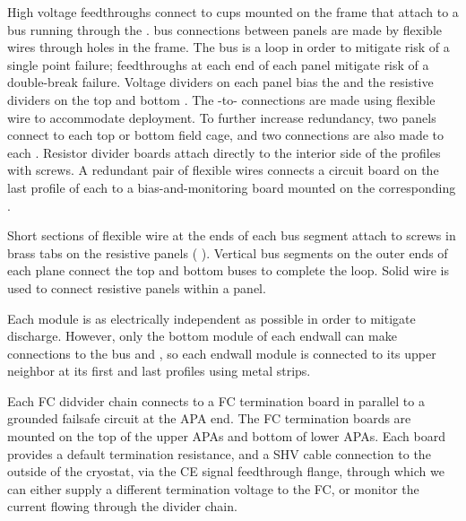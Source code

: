High voltage feedthroughs connect to cups mounted on the  frame
that attach to a  bus running through the .   bus connections
between  panels are made by flexible wires through holes in the
 frame. The  bus is a loop in order to mitigate risk of a single
point failure; feedthroughs at each end of each  panel mitigate
risk of a double-break failure.  Voltage dividers on each  panel
bias the  and the resistive dividers on the top
and bottom .  The -to- connections are made using
flexible wire to accommodate  deployment.  To further
increase redundancy, two  panels connect to each top or bottom
field cage, and two connections are also made to each . Resistor divider boards attach directly to the interior side of
the  profiles with screws.   A redundant pair of flexible wires
connects a circuit board on the last profile of each  to a
bias-and-monitoring board mounted on the corresponding .

Short sections of flexible wire at the ends of each  bus segment
attach to screws in brass tabs on the  resistive panels ( ).
Vertical  bus segments on the outer ends of each  plane connect
the top and bottom  buses to complete the loop.  Solid wire is used
to connect resistive panels within a  panel.

Each  module is as electrically independent as possible in order to
mitigate discharge.  However, only the bottom module of each endwall
can make connections to the  bus and , so each endwall module
is connected to its upper neighbor at its first and last profiles
using metal strips.

Each FC didvider chain connects to a FC termination board in parallel to a grounded failsafe circuit at the APA end.  The FC termination boards are mounted on the top of the upper APAs and bottom of lower APAs.  Each board provides a default termination resistance, and a SHV cable connection to the outside of the cryostat, via the CE signal feedthrough flange, through which we can either supply a different termination voltage to the FC, or monitor the current flowing through the divider chain.

